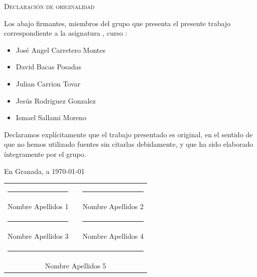 %

\thispagestyle{empty}

\hfill\vfill

\textsc{Declaración de originalidad}\\\bigskip

Los abajo firmantes, miembros del grupo que presenta el presente trabajo
correspondiente a la asignatura \textit{\miAsignatura}, curso \miCurso:

\medskip

\begin{itemize}
  \item José Angel Carretero Montes
  \item David Bacas Posadas
  \item Julian Carrion Tovar
  \item Jesús Rodriguez Gonzalez
  \item Ismael Sallami Moreno
\end{itemize}

\medskip

Declaramos explícitamente que el trabajo presentado es original, en el sentido
de que no hemos utilizado fuentes sin citarlas debidamente, y que ha sido
elaborado íntegramente por el grupo.

\medskip

En Granada, a \today

\vspace{2.5cm}

\begin{center}
  \begin{tabular}{ccc}
    \rule{5cm}{0.4pt} & \hspace{1cm} & \rule{5cm}{0.4pt} \\
    Nombre Apellidos 1 & & Nombre Apellidos 2 \\[1.5cm]
    \rule{5cm}{0.4pt} & \hspace{1cm} & \rule{5cm}{0.4pt} \\
    Nombre Apellidos 3 & & Nombre Apellidos 4 \\[1.5cm]
    \multicolumn{3}{c}{\rule{5cm}{0.4pt}} \\
    \multicolumn{3}{c}{Nombre Apellidos 5}
  \end{tabular}
\end{center}

\vfill

\cleardoublepage
\endinput
